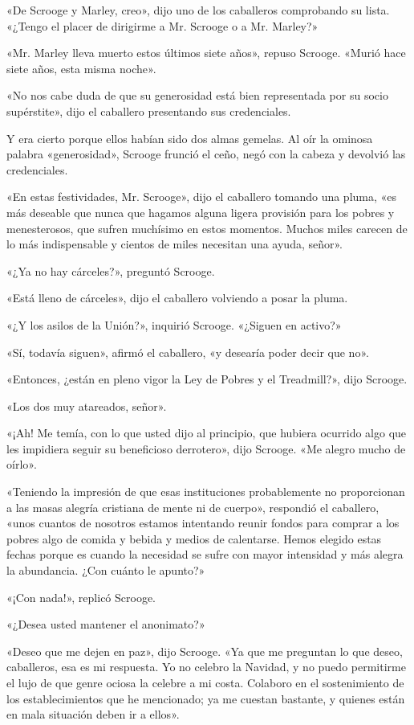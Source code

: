 \documentclass{novela}
\begin{document}
 «De Scrooge y Marley, creo», dijo uno de los caballeros comprobando su lista. «¿Tengo el placer de dirigirme a Mr. Scrooge o a Mr. Marley?»

 «Mr. Marley lleva muerto estos últimos siete años», repuso Scrooge. «Murió hace siete años, esta misma noche».

 «No nos cabe duda de que su generosidad está bien representada por su socio supérstite», dijo el caballero presentando sus credenciales.

 Y era cierto porque ellos habían sido dos almas gemelas. Al oír la ominosa palabra «generosidad», Scrooge frunció el ceño, negó con la cabeza y devolvió las credenciales.

 «En estas festividades, Mr. Scrooge», dijo el caballero tomando una pluma, «es más deseable que nunca que hagamos alguna ligera provisión para los pobres y menesterosos, que sufren muchísimo en estos momentos. Muchos miles carecen de lo más indispensable y cientos de miles necesitan una ayuda, señor».

 «¿Ya no hay cárceles?», preguntó Scrooge.

 «Está lleno de cárceles», dijo el caballero volviendo a posar la pluma.

 «¿Y los asilos de la Unión?», inquirió Scrooge. «¿Siguen en activo?»

 «Sí, todavía siguen», afirmó el caballero, «y desearía poder decir que no».

 «Entonces, ¿están en pleno vigor la Ley de Pobres y el Treadmill?», dijo Scrooge.

 «Los dos muy atareados, señor».

 «¡Ah! Me temía, con lo que usted dijo al principio, que hubiera ocurrido algo que les impidiera seguir su beneficioso derrotero», dijo Scrooge. «Me alegro mucho de oírlo».

 «Teniendo la impresión de que esas instituciones probablemente no proporcionan a las masas alegría cristiana de mente ni de cuerpo», respondió el caballero, «unos cuantos de nosotros estamos intentando reunir fondos para comprar a los pobres algo de comida y bebida y medios de calentarse. Hemos elegido estas fechas porque es cuando la necesidad se sufre con mayor intensidad y más alegra la abundancia. ¿Con cuánto le apunto?»

 «¡Con nada!», replicó Scrooge.

 «¿Desea usted mantener el anonimato?»

 «Deseo que me dejen en paz», dijo Scrooge. «Ya que me preguntan lo que deseo, caballeros, esa es mi respuesta. Yo no celebro la Navidad, y no puedo permitirme el lujo de que genre ociosa la celebre a mi costa. Colaboro en el sostenimiento de los establecimientos que he mencionado; ya me cuestan bastante, y quienes están en mala situación deben ir a ellos».
\end{document}
